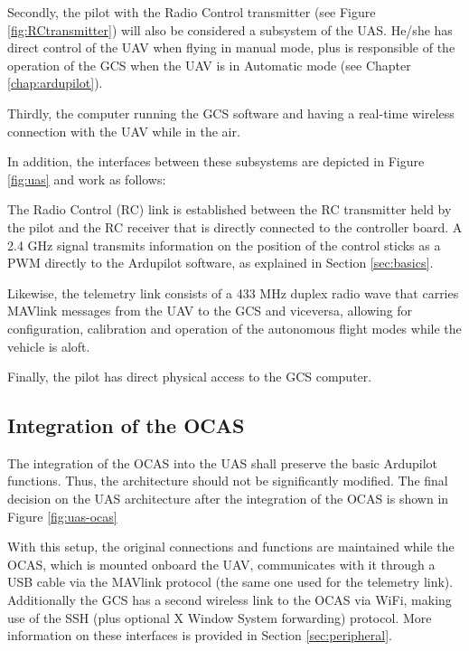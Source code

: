 Secondly, the pilot with the Radio Control transmitter (see Figure \ref{fig:RCtransmitter}) will also be considered a subsystem of the UAS.
He/she has direct control of the UAV when flying in manual mode, plus is responsible of the operation of the GCS when the UAV is in Automatic mode (see Chapter \ref{chap:ardupilot}).

Thirdly, the computer running the GCS software and having a real-time wireless connection with the UAV while in the air.



In addition, the interfaces between these subsystems are depicted in Figure \ref{fig:uas} and work as follows:

The Radio Control (RC) link is established between the RC transmitter held by the pilot and the RC receiver that is directly connected to the controller board.
A 2.4 GHz signal transmits information on the position of the control sticks as a PWM directly to the Ardupilot software, as explained in Section \ref{sec:basics}.

Likewise, the telemetry link consists of a 433 MHz duplex radio wave that carries MAVlink messages from the UAV to the GCS and viceversa, allowing for configuration, calibration and operation of the autonomous flight modes while the vehicle is aloft.

Finally, the pilot has direct physical access to the GCS computer.

\subsection{Integration of the OCAS} \label{sec:ocasintegration}

The integration of the OCAS into the UAS shall preserve the basic Ardupilot functions.
Thus, the architecture should not be significantly modified.
The final decision on the UAS architecture after the integration of the OCAS is shown in Figure \ref{fig:uas-ocas}



With this setup, the original connections and functions are maintained while the OCAS, which is mounted onboard the UAV, communicates with it through a USB cable via the MAVlink protocol (the same one used for the telemetry link).
Additionally the GCS has a second wireless link to the OCAS via WiFi, making use of the SSH (plus optional X Window System forwarding) protocol.
More information on these interfaces is provided in Section \ref{sec:peripheral}.


